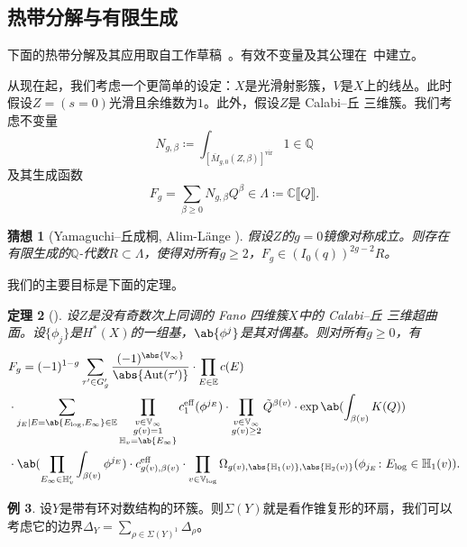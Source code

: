 \documentclass{amsart}
\newtheorem{thm}{定理}[section]
\newtheorem{conj}[thm]{猜想}
\theoremstyle{definition}
\newtheorem{exm}[thm]{例}
\theoremstyle{remark}
\theoremstyle{plain}
\theoremstyle{definition}
\theoremstyle{remark}
\newcommand{\C}{\mathbb{C}}
\newcommand{\Q}{\mathbb{Q}}
\newcommand{\E}{\mathbb{E}}
\newcommand{\V}{\mathbb{V}}
\renewcommand{\H}{\mathbb{H}}
\newcommand{\mr}[1]{\mathrm{#1}}
\newcommand{\on}[1]{\operatorname{#1}}
\newcommand{\1}{\mathbf{1}}
\newcommand{\2}{\mathbf{2}}
\newcommand{\3}{\mathbf{3}}
\newcommand{\vir}{\mr{vir}}
\newcommand{\ps}[1]{\llbracket #1 \rrbracket}
\DeclareMathOperator{\Aut}{Aut}
\begin{document}
\subsection{热带分解与有限生成}%
\label{sub:Tropical decomposition and finite generation}

下面的热带分解及其应用取自工作草稿~\cite{CJRtropical2025}。有效不变量及其公理在~\cite{CJRpunctured}中建立。

从现在起，我们考虑一个更简单的设定：\(X\)是光滑射影簇，\(V\)是\(X\)上的线丛。此时假设\(Z = (s = 0)\)光滑且余维数为\(1\)。此外，假设\(Z\)是 Calabi--丘 三维簇。我们考虑不变量
\[ N_{g, \beta} \coloneqq \int_{[\bar{M}_{g,0}(Z, \beta)]^{\vir}} 1 \in \Q \]
及其生成函数
\[ F_g = \sum_{\beta \geq 0} N_{g, \beta} Q^{\beta} \in \Lambda \coloneqq \C \ps{Q}. \]

\begin{conj}[Yamaguchi--丘成桐, Alim-L\"ange {\cite{YY2004,AlimLange2007}}]
    假设\(Z\)的\(g=0\)镜像对称成立。则存在有限生成的\(\Q\)-代数\(R \subset \Lambda\)，使得对所有\(g \geq 2\)，\(F_g \in (I_0(q))^{2g-2} R\)。
\end{conj}

我们的主要目标是下面的定理。

\begin{thm}[{\cite{CJRtropical2025}}]
    设\(Z\)是没有奇数次上同调的 Fano 四维簇\(X\)中的 Calabi--丘 三维超曲面。设\(\{\phi_j\}\)是\(H^*(X)\)的一组基，\(\ab\{\phi^j\}\)是其对偶基。则对所有\(g \geq 0\)，有
    \begin{align*}
        &F_g = (-1)^{1-g} \sum_{\tau' \in G_g'} \frac{(-1)^{\abs{\V_{\infty}}}}{\abs{\Aut(\tau')}} \cdot \prod_{E \in \E} c(E) \\
        & \cdot \sum_{j_E \mid E = \ab\{E_{\log}, E_{\infty}\} \in \E} \prod_{\substack{v \in \V_{\infty} \\ g(v)=1 \\ \H_v = \ab\{E_{\infty}\}}} c_1^{\mr{eff}}(\phi^{j_E}) \cdot \prod_{\substack{v \in \V_{\infty} \\ g(v) \geq 2}} \tilde{Q}^{\beta(v)} \cdot \exp \ab(\int_{\beta(v)} K(Q) )  \\
        & \cdot \ab(\prod_{E_{\infty} \in \H_v'}\int_{\beta(v)} \phi^{j_E}) \cdot c_{g(v), \beta(v)}^{\on{eff}} 
         \cdot \prod_{v \in \V_{\log}} \Omega_{g(v), \abs{\H_1(v)}, \abs{\H_2(v)}} (\phi_{j_E} \colon E_{\log} \in \H_1(v)).
    \end{align*}
\end{thm}

\begin{exm}
    设\(Y\)是带有环对数结构的环簇。则\(\Sigma(Y)\)就是看作锥复形的环扇，我们可以考虑它的边界\(\Delta_Y = \sum_{\rho \in \Sigma(Y)^1} \Delta_{\rho}\)。
\end{exm}
\end{document}
